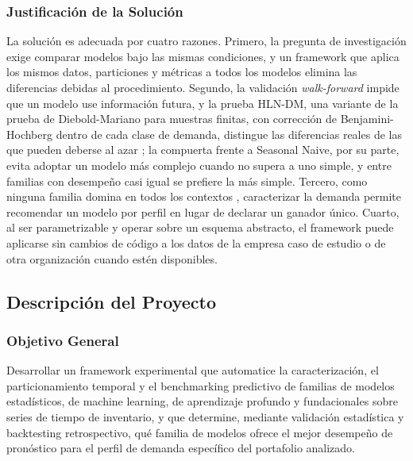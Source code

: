 \subsubsection{Justificación de la Solución}
La solución es adecuada por cuatro razones. Primero, la pregunta de investigación exige comparar modelos bajo las mismas condiciones, y un framework que aplica los mismos datos, particiones y métricas a todos los modelos elimina las diferencias debidas al procedimiento. Segundo, la validación \textit{walk-forward} impide que un modelo use información futura, y la prueba HLN-DM, una variante de la prueba de Diebold-Mariano para muestras finitas, con corrección de Benjamini-Hochberg dentro de cada clase de demanda, distingue las diferencias reales de las que pueden deberse al azar \cite{dm,harvey1997,benjamini1995}; la compuerta frente a Seasonal Naive, por su parte, evita adoptar un modelo más complejo cuando no supera a uno simple, y entre familias con desempeño casi igual se prefiere la más simple. Tercero, como ninguna familia domina en todos los contextos \cite{m4,m5}, caracterizar la demanda permite recomendar un modelo por perfil en lugar de declarar un ganador único. Cuarto, al ser parametrizable y operar sobre un esquema abstracto, el framework puede aplicarse sin cambios de código a los datos de la empresa caso de estudio o de otra organización cuando estén disponibles.


\subsection{Descripción del Proyecto}

\subsubsection{Objetivo General}
Desarrollar un framework experimental que automatice la caracterización, el particionamiento temporal y el benchmarking predictivo de familias de modelos estadísticos, de machine learning, de aprendizaje profundo y fundacionales sobre series de tiempo de inventario, y que determine, mediante validación estadística y backtesting retrospectivo, qué familia de modelos ofrece el mejor desempeño de pronóstico para el perfil de demanda específico del portafolio analizado.



